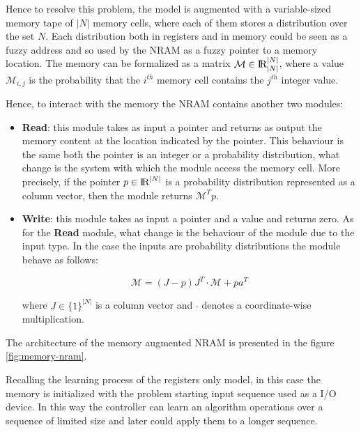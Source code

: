 Hence to resolve this problem, the model is augmented with a variable-sized memory tape of $|N|$ memory cells, where each of them stores a distribution over the set $N$. Each distribution both in registers and in memory could be seen as a fuzzy address and so used by the NRAM as a fuzzy pointer to a memory location. The memory can be formalized as a matrix $\mathcal{M} \in \textrm{I\!R}_{|N|}^{|N|}$, where a value $\mathcal{M}_{i,j}$ is the probability that the $i^{th}$ memory cell contains the $j^{th}$ integer value.

Hence, to interact with the memory the NRAM contains another two modules:
\begin{itemize}
	\item{\textbf{Read}: this module takes as input a pointer and returns as output the memory content at the location indicated by the pointer. This behaviour is the same both the pointer is an integer or a probability distribution, what change is the system with which the module access the memory cell. More precisely, if the pointer $p\in\textrm{I\!R}^{|N|}$ is a probability distribution represented as a column vector, then the module returns $\mathcal{M}^{T}p$.}
	\item{\textbf{Write}: this module takes as input a pointer and a value and returns zero. As for the \textbf{Read} module,  what change is the behaviour of the module due to the input type. In the case the inputs are probability distributions the module behave as follows:
\begin{center}
	\begin{equation}
	\mathcal{M} = (J - p)J^{T} \cdot \mathcal{M} + pa^{T}
	\end{equation}
\end{center}	
where $J \in \{1\}^{|N|}$ is a column vector and $\cdot$ denotes a coordinate-wise multiplication.}
\end{itemize}
The architecture of the memory augmented NRAM is presented in the figure \ref{fig:memory-nram}.

Recalling the learning process of the registers only model, in this case the memory is initialized with the problem starting input sequence used as a I/O device. In this way the controller can learn an algorithm operations over a sequence of limited size and later could apply them to a longer sequence.

